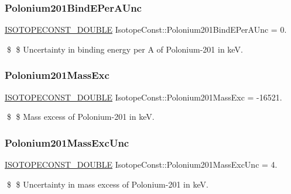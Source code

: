 \subsubsection{\texorpdfstring{Polonium201\+Bind\+E\+Per\+A\+Unc}{Polonium201BindEPerAUnc}}
{\footnotesize\ttfamily \mbox{\hyperlink{group___isotope_const-_macros_ga8f45a7272ce02c0b4c65c44636ed719a}{I\+S\+O\+T\+O\+P\+E\+C\+O\+N\+S\+T\+\_\+\+D\+O\+U\+B\+LE}} Isotope\+Const\+::\+Polonium201\+Bind\+E\+Per\+A\+Unc = 0.}

\$ \$ Uncertainty in binding energy per A of Polonium-\/201 in keV. \mbox{\label{group___isotope_const-_polonium-_po201_ga4d60f35ba8c46d690b120c11ad999e56}} 
\subsubsection{\texorpdfstring{Polonium201\+Mass\+Exc}{Polonium201MassExc}}
{\footnotesize\ttfamily \mbox{\hyperlink{group___isotope_const-_macros_ga8f45a7272ce02c0b4c65c44636ed719a}{I\+S\+O\+T\+O\+P\+E\+C\+O\+N\+S\+T\+\_\+\+D\+O\+U\+B\+LE}} Isotope\+Const\+::\+Polonium201\+Mass\+Exc = -\/16521.}

\$ \$ Mass excess of Polonium-\/201 in keV. \mbox{\label{group___isotope_const-_polonium-_po201_ga6d3e05d8ed2df06327eafca6587d7a28}} 
\subsubsection{\texorpdfstring{Polonium201\+Mass\+Exc\+Unc}{Polonium201MassExcUnc}}
{\footnotesize\ttfamily \mbox{\hyperlink{group___isotope_const-_macros_ga8f45a7272ce02c0b4c65c44636ed719a}{I\+S\+O\+T\+O\+P\+E\+C\+O\+N\+S\+T\+\_\+\+D\+O\+U\+B\+LE}} Isotope\+Const\+::\+Polonium201\+Mass\+Exc\+Unc = 4.}

\$ \$ Uncertainty in mass excess of Polonium-\/201 in keV. \mbox{\label{group___isotope_const-_polonium-_po201_ga2fe90664341baef8d0e8c25ad53ef2ea}} 
